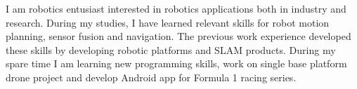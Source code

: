 

\begin{cvparagraph}

I am robotics entusiast interested in robotics applications both in industry and research.
During my studies, I have learned relevant skills for robot motion planning, sensor fusion and
navigation. The previous work experience developed these skills by developing robotic platforms and SLAM
products. During my spare time I am learning new programming skills, work on single base platform drone project
and develop Android app for Formula 1 racing series.
\end{cvparagraph}
